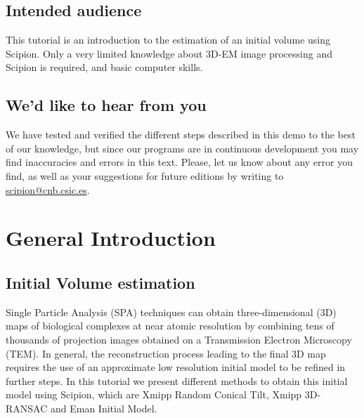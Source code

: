 \documentclass[12pt]{article} %
\begin{document}



\subsection*{Intended audience}

This tutorial is an introduction to the estimation of an initial
volume using Scipion.  Only a very limited knowledge about 3D-EM image
processing and Scipion is required, and basic computer skills.

\subsection*{We'd like to hear from you}

We have tested and verified the different steps described in this demo
to the best of our knowledge, but since our programs are in continuous
development you may find inaccuracies and errors in this text. Please,
let us know about any error you find, as well as your suggestions for
future editions by writing to
\href{mailto:scipion@cnb.csic.es}{scipion@cnb.csic.es}.

\newpage


\tableofcontents %

\newpage %


\section{General Introduction}

\subsection{Initial Volume estimation}

Single Particle Analysis (SPA) techniques can obtain three-dimensional (3D) maps of biological complexes 
at near atomic resolution by combining tens of thousands of projection images obtained on a 
Transmission Electron Microscopy (TEM). In general, the reconstruction process leading to the final 3D map 
requires the use of an approximate low resolution initial model to be refined in further steps. 
In this tutorial we present different methods to obtain this initial model using Scipion, 
which are Xmipp Random Conical Tilt, Xmipp 3D-RANSAC and Eman Initial Model.
\end{document}
